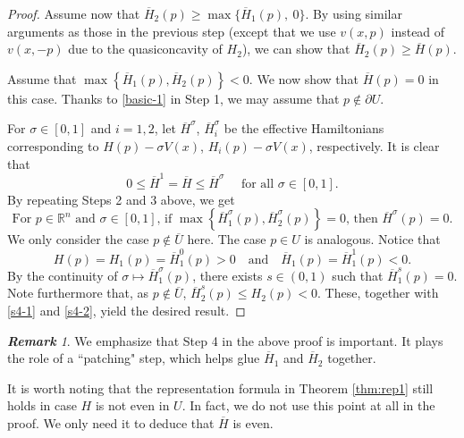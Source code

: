 \documentclass[12pt,reqno]{amsart}
\theoremstyle{plain}
\theoremstyle{remark}
\newtheorem{rem}{\bf{Remark}}
\numberwithin{equation}{section}
\newcommand{\R}{\mathbb{R}}
\newcommand{\sig}{\sigma}
\newcommand{\ol}{\overline}
\begin{document}
\begin{proof}
Assume now that $\ol{H}_2(p) \geq \max\{\ol{H}_1(p), \ 0\}$. 
By using similar arguments as those in the previous step (except that we use $v(x,p)$ instead of $v(x,-p)$ due to the quasiconcavity of $H_2$), 
we can show that $\ol{H}_2(p) \geq \ol{H}(p)$.


\smallskip

Assume that $\max\left\{\ol{H}_1(p), \ol{H}_2(p)\right\}<0$. We now show that $\ol{H}(p)=0$ in this case.
Thanks to \eqref{basic-1} in Step 1, we may assume that $p \notin \partial U$.

For $\sig \in [0,1]$ and $i=1,2$, let $\ol{H}^\sig$, $\ol{H}^\sig_i$ be the effective Hamiltonians corresponding to $H(p) - \sig V(x)$, $H_i(p)-\sig V(x)$, respectively. 
It is clear that
\begin{equation}\label{s4-1}
0 \leq \ol{H}^1=\ol{H} \leq \ol{H}^\sig \quad \text{ for all } \sig \in [0,1].
\end{equation}
By repeating Steps 2 and 3 above, we get 
\begin{equation} \label{s4-2}
\text{For $p\in\R^n$ and $\sig \in [0,1]$, if $\max\left\{\ol{H}^\sig_1(p),\ol{H}^\sig_2(p)\right\}=0$, then $\ol{H}^\sig(p)=0$.}
\end{equation}
We only consider the case $p \notin \ol{U}$ here.
The case $p \in U$ is analogous. Notice that
\[
H(p)= H_1(p) = \ol{H}^0_1(p)>0 \quad \text{and} \quad \ol{H}_1(p)= \ol{H}^1_1(p) <0.
\]
By the continuity of $\sig \mapsto \ol{H}^\sig_1(p)$, there exists $s \in (0,1)$ such that $\ol{H}^s_1(p)=0$.
Note furthermore that, as $p \notin \ol{U}$, $\ol{H}_2^s(p) \leq H_2(p) <0$.
These, together with \eqref{s4-1} and \eqref{s4-2}, yield the desired result.
\end{proof}


\begin{rem}\label{rem:step4}
We emphasize that Step 4 in the above proof is important.
It plays the role of a ``patching" step, which helps glue $\ol{H}_1$
and $\ol{H}_2$ together.

It is worth noting that the representation formula in Theorem \ref{thm:rep1} still holds in case $H$ is not even in $U$.
In fact, we do not use this point at all in the proof. We only need it to deduce that $\ol{H}$ is even.
\end{rem}
\end{document}
